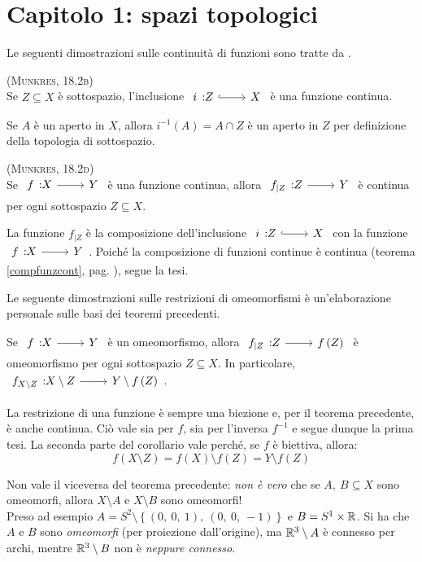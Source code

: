 \section{Capitolo 1: spazi topologici}
Le seguenti dimostrazioni sulle continuità di funzioni sono tratte da \cite{munkres:2000topology}.
\begin{theorema}\textsc{(Munkres, 18.2b)}\\
	Se $Z\subseteq X$ è sottospazio, l'inclusione $\incl{i}{Z}{X}$ è una funzione continua.
\end{theorema}
\begin{demonstration}
	Se $A$ è un aperto in $X$, allora $i^{-1}\left(A\right)=A\cap Z$ è un aperto in $Z$ per definizione della topologia di sottospazio.
\end{demonstration}
\begin{theorema}\textsc{(Munkres, 18.2d)}\\
	Se $\funz{f}{X}{Y}$ è una funzione continua, allora $\funz{f_{\mid Z}}{Z}{Y}$ è continua per ogni sottospazio $Z\subseteq X$.
\end{theorema}
\begin{demonstration}
	La funzione $f_{\mid Z}$ è la composizione dell'inclusione $\incl{i}{Z}{X}$ con la funzione $\funz{f}{X}{Y}$. Poiché la composizione di funzioni continue è continua (teorema \ref{compfunzcont}, pag. \pageref{compfunzcont}), segue la tesi.
\end{demonstration}
Le seguente dimostrazioni sulle restrizioni di omeomorfismi è un'elaborazione personale sulle basi dei teoremi precedenti.
\begin{corollary}
Se $\funz{f}{X}{Y}$ è un omeomorfismo, allora $\funz{f_{\mid Z}}{Z}{f\left(Z\right)}$ è omeomorfismo per ogni sottospazio $Z\subseteq X$. In particolare, $\funz{f_{X\setminus Z}}{X\setminus Z}{Y\setminus f\left(Z\right)}$.
\end{corollary}
\begin{demonstration}
	La restrizione di una funzione è sempre una biezione e, per il teorema precedente, è anche continua. Ciò vale sia per $f$, sia per l'inversa $f^{-1}$ e segue dunque la prima tesi. La seconda parte del corollario vale perché, se $f$ è biettiva, allora:
	\begin{equation*}
		f\left(X\setminus Z\right)=f\left(X\right)\setminus f\left(Z\right)=Y\setminus f\left(Z\right)
	\end{equation*}
\vspace{-3mm}
\end{demonstration}
\begin{attention}
	Non vale il viceversa del teorema precedente: \textit{non è vero} che se $A,\ B\subseteq X$ sono omeomorfi, allora $X\setminus A$ e $X\setminus B$ sono omeomorfi!\\
	Preso ad esempio $A=S^2\setminus\left\{(0,\ 0,\ 1),\ (0,\ 0,\ -1)\right\}$ e $B=S^1\times \mathbb{R}$. Si ha che $A$ e $B$ sono \textit{omeomorfi} (per proiezione dall'origine), ma $\mathbb{R}^3\setminus A$ è connesso per archi, mentre $\mathbb{R}^3\setminus B$ non è \textit{neppure connesso}.
\end{attention} 
